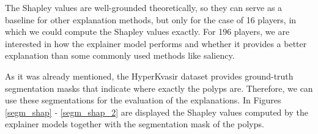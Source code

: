 \documentclass[en]{pracamgr}
\begin{document}
The Shapley values are well-grounded theoretically, so they can serve as a baseline for other explanation methods, but only for the case of 16 players, in which we could compute the Shapley values exactly. For 196 players, we are interested in how the explainer model performs and whether it provides a better explanation than some commonly used methods like saliency.





As it was already mentioned, the HyperKvasir dataset provides ground-truth segmentation masks that indicate where exactly the polyps are. Therefore, we can use these segmentations for the evaluation of the explanations.
In Figures \ref{segm_shap} - \ref{segm_shap_2} are displayed the Shapley values computed by the explainer models together with the segmentation mask of the polyps.

\pagebreak
\end{document}
